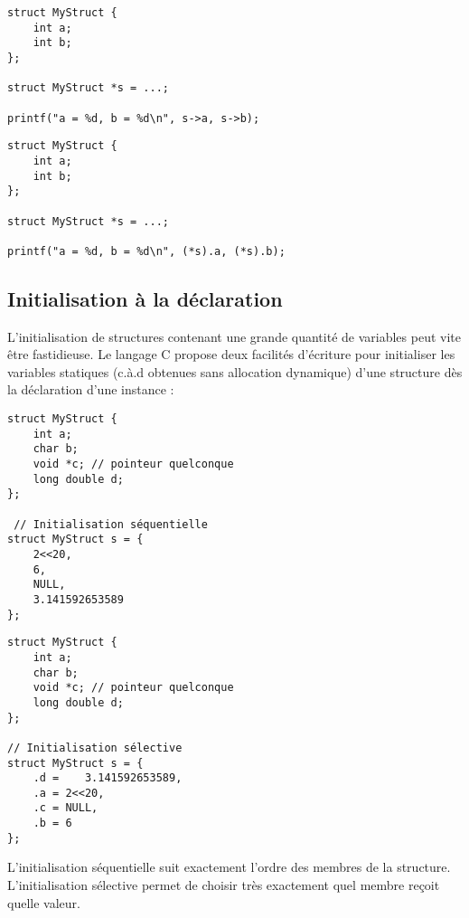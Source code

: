 \documentclass[../../../main.tex]{subfiles}
\begin{document}
\begin{minipage}{0.5\textwidth}
\begin{verbatim}
struct MyStruct {
	int a;
	int b;
};

struct MyStruct *s = ...;

printf("a = %d, b = %d\n", s->a, s->b);
\end{verbatim}
\end{minipage}
\begin{minipage}{0.5\textwidth}
\begin{verbatim}
struct MyStruct {
	int a;
	int b;
};

struct MyStruct *s = ...;

printf("a = %d, b = %d\n", (*s).a, (*s).b);
\end{verbatim}
\end{minipage}
\subsection{Initialisation à la déclaration}
\label{sub:initialisation_la_d_claration}
L'initialisation de structures contenant une grande quantité de variables peut vite être fastidieuse. Le langage C propose deux facilités d'écriture pour initialiser les variables statiques (c.à.d obtenues sans allocation dynamique) d'une structure dès la déclaration d'une instance : 

\begin{minipage}{0.5\textwidth}
\begin{verbatim}
struct MyStruct {
	int a;
	char b;
	void *c; // pointeur quelconque
	long double d; 
};

 // Initialisation séquentielle
struct MyStruct s = {
	2<<20,
	6,
	NULL,
	3.141592653589
};
\end{verbatim}
\end{minipage}
\begin{minipage}{0.5\textwidth}
\begin{verbatim}
struct MyStruct {
	int a;
	char b;
	void *c; // pointeur quelconque
	long double d;
};

// Initialisation sélective
struct MyStruct s = {
	.d =	3.141592653589,
	.a = 2<<20,
	.c = NULL,
	.b = 6
}; 
\end{verbatim}
\end{minipage}

L'initialisation séquentielle suit exactement l'ordre des membres de la structure.
\newline
L'initialisation sélective permet de choisir très exactement quel membre reçoit quelle valeur.
 
\end{document}
